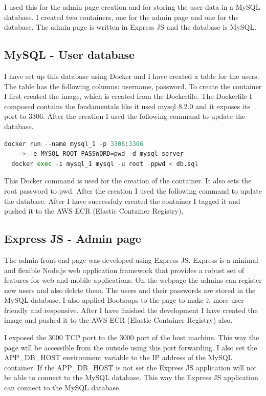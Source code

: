 \documentclass[11pt,a4paper,oneside]{report}
\begin{document}
I used this for the admin page creation and for storing the user data in a MySQL database. I created two containers, one for the admin page and one for the database. The admin page is written in Express JS and the database is MySQL.

\subsection{MySQL - User database}
I have set up this database using Docker and I have created a table for the users. The table has the following columns: username, password. To create the container I first created the image, which is created from the Dockerfile. The Dockerfile I composed contains the fondamentals like it used mysql 8.2.0 and it exposes its port to 3306.
After the creation I used the following command to update the database.
\begin{lstlisting}[language=Python,basicstyle=\ttfamily\small,]
  docker run --name mysql_1 -p 3306:3306 
    -> -e MYSQL_ROOT_PASSWORD=pwd -d mysql_server
  docker exec -i mysql_1 mysql -u root -ppwd < db.sql
\end{lstlisting}
This Docker command is used for the creation of the container. It also sets the root password to pwd. After the creation I used the following command to update the database.
After I have successfuly created the container I tagged it and pushed it to the AWS ECR (Elastic Container Registry).

\subsection{Express JS - Admin page}

The admin front end page was developed using Express JS. Express is a minimal and flexible Node.js web application framework that provides a robust set of features for web and mobile applications.
On the webpage the admins can register new users and also delete them. The users and their passwords are stored in the MySQL database. I also applied Bootsraps to the page to make it more user friendly and responsive.
After I have finished the development I have created the image and pushed it to the AWS ECR (Elastic Container Registry) also.

I exposed the 3000 TCP port to the 3000 port of the host machine. This way the page will be accessible from the outside using this port forwarding.
I also set the APP\_DB\_HOST environment variable to the IP address of the MySQL container. If the APP\_DB\_HOST is not set the Express JS application will not be able to connect to the MySQL database.
This way the Express JS application can connect to the MySQL database.
\end{document}

